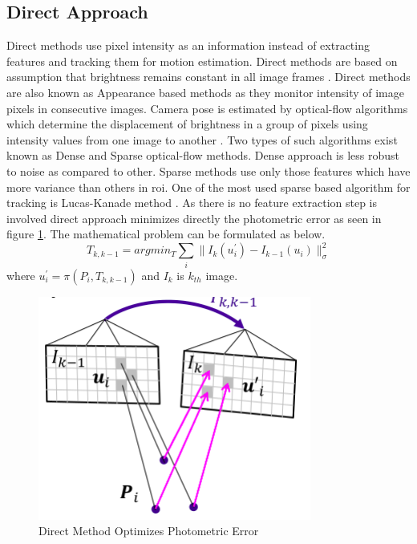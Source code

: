\subsection{Direct Approach}
\label{direct}
Direct methods use pixel intensity as an information instead of extracting features and tracking them for motion estimation. Direct methods are based on assumption that brightness remains constant in all image frames \cite{Irani-et-al-1999}. Direct methods are also known as Appearance based methods as they monitor intensity of image pixels in consecutive images. Camera pose is estimated by optical-flow algorithms which determine the displacement of brightness in a group of pixels using intensity values from one image to another \cite{Aqel-et-al-2016}. Two types of such algorithms exist known as Dense and Sparse optical-flow methods. Dense approach is less robust to noise as compared to other. Sparse methods use only those features which have more variance than others in \acrshort{roi}. One of the most used sparse based algorithm for tracking is Lucas-Kanade method \cite{Lucas81}. As there is no feature extraction step is involved direct approach minimizes directly the photometric error as seen in figure \ref{fig:direct}. The mathematical problem can be formulated as below. 
\begin{equation*}
	T_{k,k-1} = arg min_{T} \sum_{i} \| I_{k}(u^{'}_{i})- I_{k-1}(u_{i})\|^{2}_{\sigma}
\end{equation*}
where $u^{'}_{i} = \pi (P_{i},T_{k,k-1})$ and $I_{k} $ is  $k_{th}$ image.
\newline
\begin{figure}[h]
	\centering
	\includegraphics[width=0.8\textwidth]{direct}
	\caption{Direct Method Optimizes Photometric Error \cite{lecture}}
	\label{fig:direct}
\end{figure}

